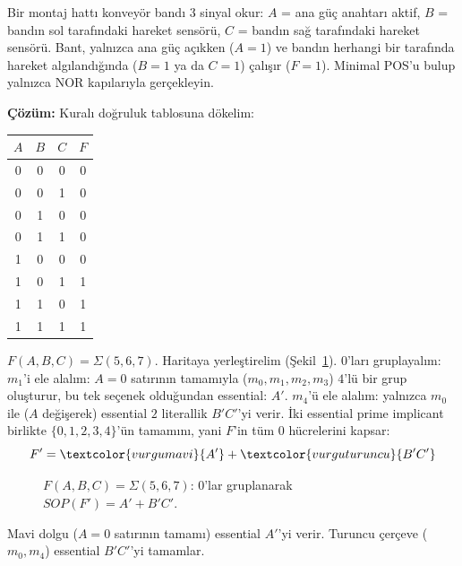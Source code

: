\begin{alistirma}[\orta]
Bir montaj hattı konveyör bandı $3$ sinyal okur: $A$ = ana güç anahtarı aktif, $B$ = bandın
sol tarafındaki hareket sensörü, $C$ = bandın sağ tarafındaki hareket sensörü. Bant,
yalnızca ana güç açıkken ($A=1$) ve bandın herhangi bir tarafında hareket algılandığında
($B=1$ ya da $C=1$) çalışır ($F=1$). Minimal POS'u bulup yalnızca NOR kapılarıyla
gerçekleyin.

\textbf{Çözüm:} Kuralı doğruluk tablosuna dökelim:
\begin{center}
\begin{tabular}{ccc|c}
\toprule
$A$&$B$&$C$&$F$\\
\midrule
0&0&0&0\\
0&0&1&0\\
0&1&0&0\\
0&1&1&0\\
1&0&0&0\\
1&0&1&1\\
1&1&0&1\\
1&1&1&1\\
\bottomrule
\end{tabular}
\end{center}
$F(A,B,C)=\Sigma(5,6,7)$. Haritaya yerleştirelim (Şekil~\ref{fig:kmap-alistirma13}).
$0$'ları gruplayalım: $m_1$'i ele alalım: $A=0$ satırının tamamıyla
($m_0,m_1,m_2,m_3$) $4$'lü bir grup oluşturur, bu tek seçenek olduğundan essential: $A'$.
$m_4$'ü ele alalım: yalnızca $m_0$ ile ($A$ değişerek) essential $2$ literallik $B'C'$'yi
verir. İki essential prime implicant birlikte $\{0,1,2,3,4\}$'ün tamamını, yani $F$'in
tüm $0$ hücrelerini kapsar:
\[
F' = \textcolor{vurgumavi}{A'} + \textcolor{vurguturuncu}{B'C'}
\]

\begin{figure}[H]
\centering
{}
\caption{$F(A,B,C)=\Sigma(5,6,7)$: $0$'lar gruplanarak $SOP(F')=A'+B'C'$.}
\label{fig:kmap-alistirma13}
\end{figure}
Mavi dolgu ($A=0$ satırının tamamı) essential $A'$'yi verir. Turuncu çerçeve ($m_0,m_4$)
essential $B'C'$'yi tamamlar.


\end{alistirma}
